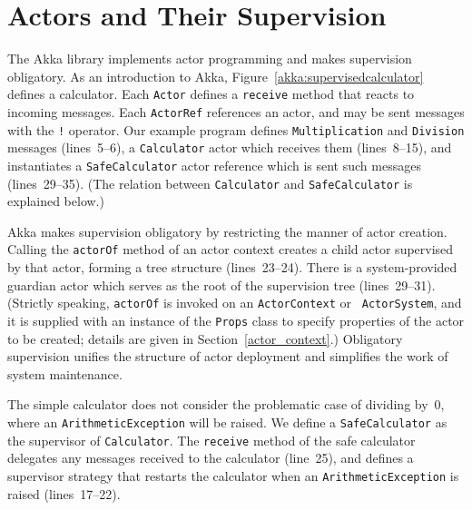 \section{Actors and Their Supervision}
\label{actor}

The Akka library \cite{akka_doc} implements actor programming and
makes supervision obligatory. As an introduction to Akka,
Figure~\ref{akka:supervisedcalculator} defines a calculator.
Each {\tt Actor} defines a {\tt receive} method that reacts to
incoming messages. Each {\tt ActorRef} references an actor, and
may be sent messages with the {\tt !} operator. Our example
program defines {\tt Multiplication} and {\tt Division} messages
(lines~5--6), a {\tt Calculator} actor which receives them
(lines~8--15), and instantiates a {\tt SafeCalculator} actor
reference which is sent such messages (lines~29--35).
(The relation between {\tt Calculator} and {\tt SafeCalculator}
is explained below.)

Akka makes supervision obligatory by restricting the manner of actor
creation.  Calling the {\tt actorOf} method of an actor context
creates a child actor supervised by that actor, forming a tree
structure (lines~23--24).  There is a system-provided guardian actor which
serves as the root of the supervision tree (lines~29--31).  (Strictly
speaking, {\tt actorOf} is invoked on an {\tt ActorContext} or {\tt
  ActorSystem}, and it is supplied with an instance of the {\tt Props}
class to specify properties of the actor to be created; details are
given in Section~\ref{actor_context}.)  Obligatory supervision unifies
the structure of actor deployment and simplifies the work of system
maintenance.


The simple calculator does not consider the problematic case of dividing by~0,
where an {\tt ArithmeticException} will be raised.  We define 
a {\tt SafeCalculator} as the supervisor of {\tt Calculator}.
The {\tt receive} method of the safe calculator delegates any
messages received to the calculator (line~25), and defines a
supervisor strategy that restarts the calculator when an
{\tt ArithmeticException} is raised (lines~17--22).


